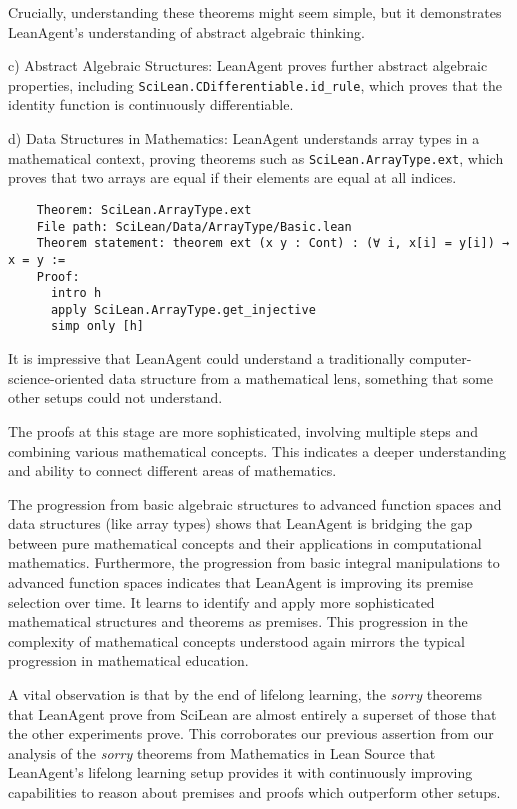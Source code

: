 \documentclass{article} %
\begin{document}
Crucially, understanding these theorems might seem simple, but it demonstrates LeanAgent's understanding of abstract algebraic thinking.

c) Abstract Algebraic Structures:
LeanAgent proves further abstract algebraic properties, including \texttt{SciLean.CDifferentiable.id\_rule}, which proves that the identity function is continuously differentiable.

d) Data Structures in Mathematics:
LeanAgent understands array types in a mathematical context, proving theorems such as \texttt{SciLean.ArrayType.ext}, which proves that two arrays are equal if their elements are equal at all indices.

\begin{verbatim}
    Theorem: SciLean.ArrayType.ext
    File path: SciLean/Data/ArrayType/Basic.lean
    Theorem statement: theorem ext (x y : Cont) : (∀ i, x[i] = y[i]) → x = y :=
    Proof:
      intro h
      apply SciLean.ArrayType.get_injective
      simp only [h]
\end{verbatim}

It is impressive that LeanAgent could understand a traditionally computer-science-oriented data structure from a mathematical lens, something that some other setups could not understand.

The proofs at this stage are more sophisticated, involving multiple steps and combining various mathematical concepts. This indicates a deeper understanding and ability to connect different areas of mathematics.

The progression from basic algebraic structures to advanced function spaces and data structures (like array types) shows that LeanAgent is bridging the gap between pure mathematical concepts and their applications in computational mathematics. Furthermore, the progression from basic integral manipulations to advanced function spaces indicates that LeanAgent is improving its premise selection over time. It learns to identify and apply more sophisticated mathematical structures and theorems as premises. This progression in the complexity of mathematical concepts understood again mirrors the typical progression in mathematical education.

A vital observation is that by the end of lifelong learning, the \textit{sorry} theorems that LeanAgent prove from SciLean are almost entirely a superset of those that the other experiments prove. This corroborates our previous assertion from our analysis of the \textit{sorry} theorems from Mathematics in Lean Source that LeanAgent's lifelong learning setup provides it with continuously improving capabilities to reason about premises and proofs which outperform other setups.
\end{document}
